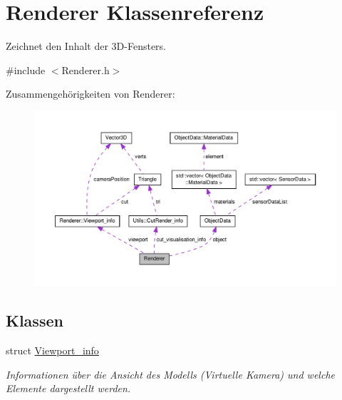 \hypertarget{classRenderer}{\section{Renderer Klassenreferenz}
\label{classRenderer}
}


Zeichnet den Inhalt der 3\-D-\/\-Fensters.  




{\ttfamily \#include $<$Renderer.\-h$>$}



Zusammengehörigkeiten von Renderer\-:\nopagebreak
\begin{figure}[H]
\begin{center}
\leavevmode
\includegraphics[width=350pt]{classRenderer__coll__graph}
\end{center}
\end{figure}
\subsection*{Klassen}
\begin{DoxyCompactItemize}
\item 
struct \hyperlink{structRenderer_1_1Viewport__info}{Viewport\-\_\-info}
\begin{DoxyCompactList}\small\item\em Informationen über die Ansicht des Modells (Virtuelle Kamera) und welche Elemente dargestellt werden. \end{DoxyCompactList}\end{DoxyCompactItemize}
